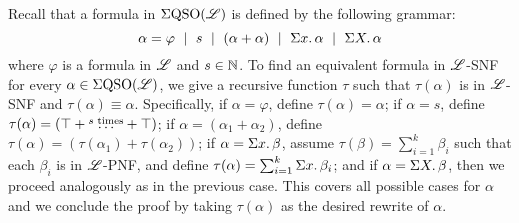 Recall that a formula in $\Sigma{\rm QSO}(\mathscr{L})$ is defined by the following grammar:
\[
\alpha = \varphi \ \mid \ s \ \mid \ (\alpha + \alpha) \ \mid \ \Sigma{x}.\, \alpha \ \mid \ \Sigma{X}.\, \alpha
\]
where $\varphi$ is a formula in $\mathscr{L}$ and $s\in\mathbb{N}$. 
To find an equivalent formula in $\mathscr{L}$-SNF for every $\alpha \in \Sigma{\rm QSO}(\mathscr{L})$, we give a recursive function $\tau$ such that $\tau(\alpha)$ is in $\mathscr{L}$-SNF and $\tau(\alpha) \equiv \alpha$. 
Specifically, if $\alpha = \varphi$, define $\tau(\alpha) = \alpha$; 
if $\alpha = s$, define $\tau(\alpha) = (\top + \overset{\text{$s $ times}}{\ldots} + \top)$;
if $\alpha = (\alpha_1 + \alpha_2)$, define $\tau(\alpha) = (\tau(\alpha_1) + \tau(\alpha_2))$;
if $\alpha = \Sigma{x}.\,\beta$, assume $\tau(\beta) = \sum_{i = 1}^{k}\beta_i$ such that each $\beta_i$ is in $\mathscr{L}$-PNF, and define $\tau(\alpha) = \sum_{i = 1}^{k}\Sigma{x}.\,\beta_i$;
and if $\alpha = \Sigma{X}.\,\beta$, then we proceed analogously as in the previous case.
This covers all possible cases for $\alpha$ and we conclude the proof by taking $\tau(\alpha)$ as the desired rewrite of $\alpha$.